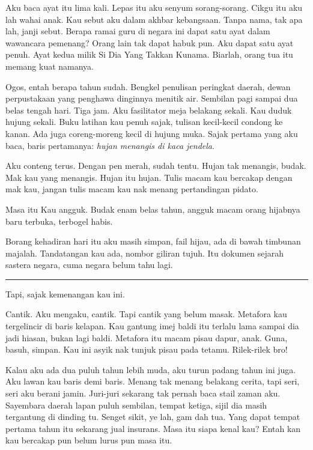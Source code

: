 \documentclass[
  11pt,
  a5paper,
  openany,
  oneside]{book}
\begin{document}
Aku baca ayat itu lima kali. Lepas itu aku senyum sorang-sorang. Cikgu
itu aku lah wahai anak. Kau sebut aku dalam akhbar kebangsaan. Tanpa
nama, tak apa lah, janji sebut. Berapa ramai guru di negara ini dapat
satu ayat dalam wawancara pemenang? Orang lain tak dapat habuk pun. Aku
dapat satu ayat penuh. Ayat kedua milik Si Dia Yang Takkan Kunama.
Biarlah, orang tua itu memang kuat namanya.

Ogos, entah berapa tahun sudah. Bengkel penulisan peringkat daerah,
dewan perpustakaan yang penghawa dinginnya menitik air. Sembilan pagi
sampai dua belas tengah hari. Tiga jam. Aku fasilitator meja belakang
sekali. Kau duduk hujung sekali. Buku latihan kau penuh sajak, tulisan
kecil-kecil condong ke kanan. Ada juga coreng-moreng kecil di hujung
muka. Sajak pertama yang aku baca, baris pertamanya: \emph{hujan
menangis di kaca jendela}.

Aku conteng terus. Dengan pen merah, sudah tentu. Hujan tak menangis,
budak. Mak kau yang menangis. Hujan itu hujan. Tulis macam kau bercakap
dengan mak kau, jangan tulis macam kau nak menang pertandingan pidato.

Masa itu Kau angguk. Budak enam belas tahun, angguk macam orang hijabnya
baru terbuka, terbogel habis.

Borang kehadiran hari itu aku masih simpan, fail hijau, ada di bawah
timbunan majalah. Tandatangan kau ada, nombor giliran tujuh. Itu dokumen
sejarah sastera negara, cuma negara belum tahu lagi.

\begin{center}\rule{0.5\linewidth}{0.5pt}\end{center}

Tapi, sajak kemenangan kau ini.

Cantik. Aku mengaku, cantik. Tapi cantik yang belum masak. Metafora kau
tergelincir di baris kelapan. Kau gantung imej baldi itu terlalu lama
sampai dia jadi hiasan, bukan lagi baldi. Metafora itu macam pisau
dapur, anak. Guna, basuh, simpan. Kau ini asyik nak tunjuk pisau pada
tetamu. Rilek-rilek bro!

Kalau aku ada dua puluh tahun lebih muda, aku turun padang tahun ini
juga. Aku lawan kau baris demi baris. Menang tak menang belakang cerita,
tapi seri, seri aku berani jamin. Juri-juri sekarang tak pernah baca
stail zaman aku. Sayembara daerah lapan puluh sembilan, tempat ketiga,
sijil dia masih tergantung di dinding tu. Senget sikit, ye lah, gam dah
tua. Yang dapat tempat pertama tahun itu sekarang jual insurans. Masa
itu siapa kenal kau? Entah kan kau bercakap pun belum lurus pun masa
itu.
\end{document}
